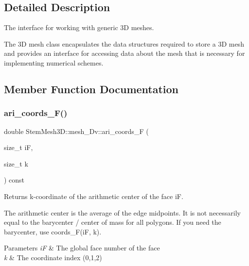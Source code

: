 \subsection{Detailed Description}
The interface for working with generic 3D meshes. 

The 3D mesh class encapsulates the data structures required to store a 3D mesh and provides an interface for accessing data about the mesh that is necessary for implementing numerical schemes. 

\subsection{Member Function Documentation}
\mbox{\label{classStemMesh3D_1_1mesh__3Dv_a3a20194034b0d98ad894bcad47d57ffe}} 
\subsubsection{\texorpdfstring{ari\+\_\+coords\+\_\+\+F()}{ari\_coords\_F()}}
{\footnotesize\ttfamily double Stem\+Mesh3\+D\+::mesh\+\_\+Dv\+::ari\+\_\+coords\+\_\+F (\begin{DoxyParamCaption}\item[{size\+\_\+t}]{iF,  }\item[{size\+\_\+t}]{k }\end{DoxyParamCaption}) const}



Returns k-\/coordinate of the arithmetic center of the face iF. 

The arithmetic center is the average of the edge midpoints. It is not necessarily equal to the barycenter / center of mass for all polygons. If you need the barycenter, use coords\+\_\+\+F(i\+F, k). 
\begin{DoxyParams}{Parameters}
{\em iF} & The global face number of the face \\
\hline
{\em k} & The coordinate index (0,1,2) \\
\hline
\end{DoxyParams}
\mbox{\label{classStemMesh3D_1_1mesh__3Dv_abcf7917eb8a7c6598e258b55a618f3e5}} 
